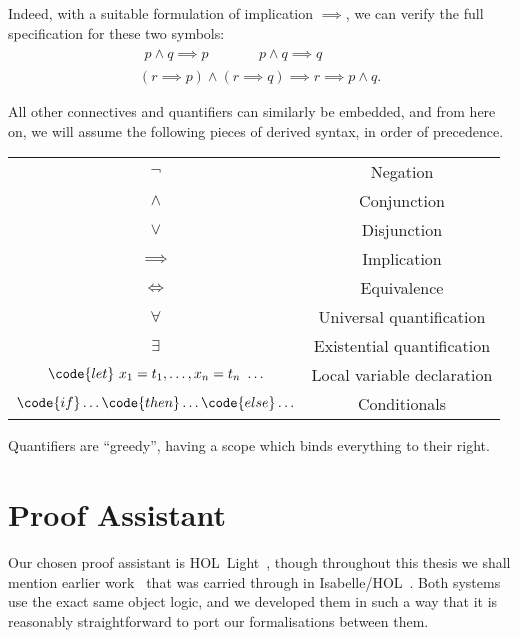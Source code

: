 Indeed, with a suitable formulation of implication $\implies$, we can verify the full specification for these two symbols:
\begin{gather}
  \begin{aligned}
    p \wedge q \implies p &\qquad& p \wedge q \implies q
  \end{aligned}\\
    (r \implies p) \wedge (r \implies q) \implies r \implies p \wedge q.
\end{gather}

All other connectives and quantifiers can similarly be embedded, and from here on, we will assume the following pieces of derived syntax, in order of precedence.

\begin{center}
\begin{tabular}{|c|c|}
\hline
$\neg$   & Negation\\
$\wedge$ & Conjunction\\
$\vee$   & Disjunction\\
$\implies$ & Implication\\
$\iff$   & Equivalence\\
$\forall$ & Universal quantification\\
$\exists$ & Existential quantification\\
$\code{let}\ x_1=t_1,\ldots, x_n=t_n\ \ldots$ & Local variable declaration\\
$\code{if}\ldots\code{then}\ldots\code{else}\ldots$ & Conditionals\\
\hline
\end{tabular}
\end{center}

Quantifiers are ``greedy'', having a scope which binds everything to their right.

\section{Proof Assistant}\label{sec:LCF}
Our chosen proof assistant is HOL~Light~\cite{HOLLight}, though throughout this thesis we shall mention earlier work~\cite{ScottMScThesis} that was carried through in Isabelle/HOL~\cite{Isabelle}. Both systems use the exact same object logic, and we developed them in such a way that it is reasonably straightforward to port our formalisations between them.


